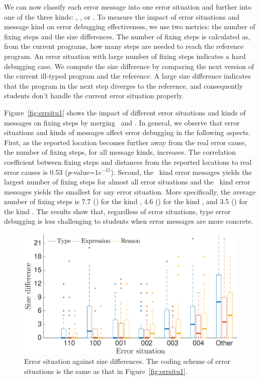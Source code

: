 \documentclass[12pt]{report}	%
\begin{document}
We can now classify each error message into one error situation
and further into one of the three kinds:
\typet, \typer, or \typee.
%
To measure the impact of error situations and message kind on
error debugging effectiveness, 
we use two metrics: the number of fixing steps and the size differences.
The number of fixing steps is calculated as, from the current programs,
how many steps are needed to reach the reference program.
%
An error situation with large number of fixing steps
indicates a hard debugging case.
%
We compute the size difference by comparing the next version of the current ill-typed program
and the reference.
A large size difference indicates that 
the program in the next step diverges to the reference,
and consequently students don't handle
the current error situation properly.

Figure~\ref{fig:errsitu1} shows the impact of 
different error situations and kinds of 
messages on fixing steps by merging \benchf\ 
and \benchs.
%
In general, we observe that
error situations and kinds of messages affect 
error debugging in the following aspects. First, 
as the reported location becomes further away from 
the real error cause, the number of fixing steps, 
for all message kinds, increases. 
%
The correlation coefficient between fixing steps and 
distances from the reported locations to real error causes
is 0.53 (\emph{p}-value=$1e^{-15}$). 
%
Second, 
%
the \typet\ kind error messages yields the largest
number of fixing steps for almost all error situations and
%
the \typee\ kind error messages yields the smallest
for any error situation.
%
%
More specifically, the average number of fixing steps
is 7.7 () for the kind \typet, 
4.6 () for the kind \typer, 
and 3.5 () for the kind \typee.
%
The results show that, regardless of error situations,
type error debugging is less challenging to students when
error messages are more concrete. 

\begin{figure}
\centering
\includegraphics[width=0.85\columnwidth]{images/size_test.eps}
\caption{Error situation against size differences. The coding
scheme of error situations is the same as that 
in Figure~\ref{fig:errsitu1}.}
\label{fig:errsitu2}
\end{figure}
\end{document}
